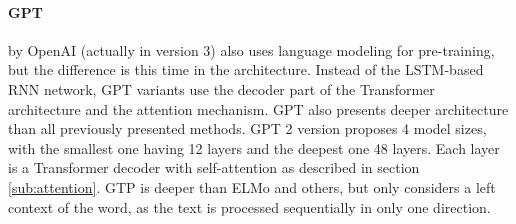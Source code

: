 \paragraph{GPT} by OpenAI (actually in version 3) also uses language modeling for pre-training, but the difference is this time in the architecture. Instead of the LSTM-based RNN network, GPT variants use the decoder part of the Transformer architecture and the attention mechanism. GPT also presents deeper architecture than all previously presented methods. GPT 2 version proposes 4 model sizes, with the smallest one having 12 layers and the deepest one 48 layers. Each layer is a Transformer decoder with self-attention as described in section \ref{sub:attention}. GTP is deeper than ELMo and others, but only considers a left context of the word, as the text is processed sequentially in only one direction.

